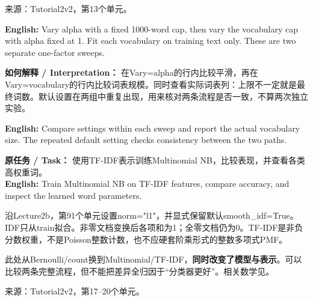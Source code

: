 来源：Tutorial2v2，第13个单元。


\textbf{English:} Vary alpha with a fixed 1000-word cap, then vary the vocabulary cap with alpha fixed at 1. Fit each vocabulary on training text only. These are two separate one-factor sweeps.








\textbf{如何解释 / Interpretation：} 在Vary=alpha的行内比较平滑，再在Vary=vocabulary的行内比较词表规模。同时查看实际词表列：上限不一定就是最终词数。默认设置在两组中重复出现，用来核对两条流程是否一致，不算两次独立实验。


\textbf{English:} Compare settings within each sweep and report the actual vocabulary size. The repeated default setting checks consistency between the two paths.







\textbf{原任务 / Task：} 使用TF-IDF表示训练Multinomial NB，比较表现，并查看各类高权重词。\\

\textbf{English:} Train Multinomial NB on TF-IDF features, compare accuracy, and inspect the learned word parameters.


沿Lecture2b，第91个单元设置norm="l1"，并显式保留默认smooth\_idf=True。IDF只从train拟合。非零文档变换后各项和为1；全零文档仍为0。TF-IDF是非负分数权重，不是Poisson整数计数，也不应硬套阶乘形式的整数多项式PMF。


此处从Bernoulli/count换到Multinomial/TF-IDF，\textbf{同时改变了模型与表示}。可以比较两条完整流程，但不能把差异全归因于“分类器更好”。相关数学见。


来源：Tutorial2v2，第17–20个单元。








